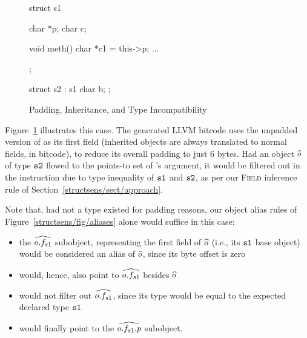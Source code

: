 \begin{figure}[h!t]
  \begin{minipage}[b]{.3\linewidth}
    \begin{cppcode}
      struct s1 {
        char *p;
        char c;

        void meth() {
          char *c1 = this->p;
          ...
        }
      };

      struct s2 : s1 {
        char b;
      };
    \end{cppcode}
    \label{structsens/fig/typeincompat:cxx}
  \end{minipage}%
  \begin{minipage}[b]{.7\linewidth}
    \centering\large
    \label{structsens/fig/typeincompat:bitcode}
  \end{minipage}
  \caption{Padding, Inheritance, and Type Incompatibility}
  \label{structsens/fig/typeincompat}
\end{figure}

Figure~\ref{structsens/fig/typeincompat} illustrates this case. The
generated LLVM bitcode uses the unpadded version of  as its
first field (inherited objects are always translated to normal fields,
in bitcode), to reduce its overall padding to just 6 bytes. Had an
object \(\widehat{o}\) of type \(\texttt{s2}\) flowed to the points-to set
of 's  argument, it would be filtered out
in the  instruction due to type inequality of
\(\texttt{s1}\) and \(\texttt{s2}\), as per our \textsc{Field} inference rule
of Section~\ref{structsens/sect/approach}.

Note that, had not a  type existed for padding
reasons, our object alias rules of Figure~\ref{structsens/fig/aliases}
alone would suffice in this case:
\begin{itemize}[\(\cdot\)]
\item the \(\widehat{o.f_{s1}}\) subobject, representing the first field
  of \(\widehat{o}\) (i.e., its \(\texttt{s1}\) base object) would be
  considered an alias of \(\widehat{o}\), since its byte offset is zero
\item {} would, hence, also point to \(\widehat{o.f_{s1}}\)
  besides \(\widehat{o}\)
\item {} would not filter out \(\widehat{o.f_{s1}}\),
  since its type would be equal to the expected declared type
  \(\texttt{s1}\)
\item {} would finally point to the \(\widehat{o.f_{s1}.p}\)
  subobject.
\end{itemize}


